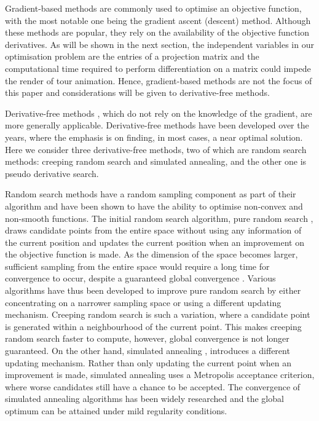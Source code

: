 Gradient-based methods are commonly used to optimise an objective
function, with the most notable one being the gradient ascent (descent)
method. Although these methods are popular, they rely on the
availability of the objective function derivatives. As will be shown in
the next section, the independent variables in our optimisation problem
are the entries of a projection matrix and the computational time
required to perform differentiation on a matrix could impede the render
of tour animation. Hence, gradient-based methods are not the focus of
this paper and considerations will be given to derivative-free methods.

Derivative-free methods
\citep{conn2009introduction, rios2013derivative}, which do not rely on
the knowledge of the gradient, are more generally applicable.
Derivative-free methods have been developed over the years, where the
emphasis is on finding, in most cases, a near optimal solution. Here we
consider three derivative-free methods, two of which are random search
methods: creeping random search and simulated annealing, and the other
one is pseudo derivative search.

Random search methods
\citep{Romeijn2009, zabinsky2013stochastic, andradottir2015review} have
a random sampling component as part of their algorithm and have been
shown to have the ability to optimise non-convex and non-smooth
functions. The initial random search algorithm, pure random search
\citep{Brooks1958-zk}, draws candidate points from the entire space
without using any information of the current position and updates the
current position when an improvement on the objective function is made.
As the dimension of the space becomes larger, sufficient sampling from
the entire space would require a long time for convergence to occur,
despite a guaranteed global convergence \citep{spall2005introduction}.
Various algorithms have thus been developed to improve pure random
search by either concentrating on a narrower sampling space or using a
different updating mechanism. Creeping random search
\citep{White1971-ci} is such a variation, where a candidate point is
generated within a neighbourhood of the current point. This makes
creeping random search faster to compute, however, global convergence is
not longer guaranteed. On the other hand, simulated annealing
\citep{kirkpatrick1983optimization, bertsimas1993simulated}, introduces
a different updating mechanism. Rather than only updating the current
point when an improvement is made, simulated annealing uses a Metropolis
acceptance criterion, where worse candidates still have a chance to be
accepted. The convergence of simulated annealing algorithms has been
widely researched \citep{mitra1986convergence, granville1994simulated}
and the global optimum can be attained under mild regularity conditions.

